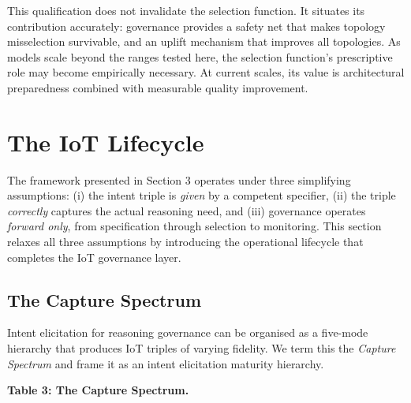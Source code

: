 \documentclass[11pt,a4paper]{article}
\begin{document}
This qualification does not invalidate the selection function. It
situates its contribution accurately: governance provides a safety net
that makes topology misselection survivable, and an uplift mechanism
that improves all topologies. As models scale beyond the ranges tested
here, the selection function's prescriptive role may become empirically
necessary. At current scales, its value is architectural preparedness
combined with measurable quality improvement.

\section{The IoT Lifecycle}\label{the-iot-lifecycle}

The framework presented in Section 3 operates under three simplifying
assumptions: (i) the intent triple is \emph{given} by a competent
specifier, (ii) the triple \emph{correctly} captures the actual
reasoning need, and (iii) governance operates \emph{forward only}, from
specification through selection to monitoring. This section relaxes all
three assumptions by introducing the operational lifecycle that
completes the IoT governance layer.

\subsection{The Capture Spectrum}\label{the-capture-spectrum}

Intent elicitation for reasoning governance can be organised as a
five-mode hierarchy that produces IoT triples of varying fidelity. We
term this the \emph{Capture Spectrum} and frame it as an intent
elicitation maturity hierarchy.

\textbf{Table 3: The Capture Spectrum.}
\end{document}
